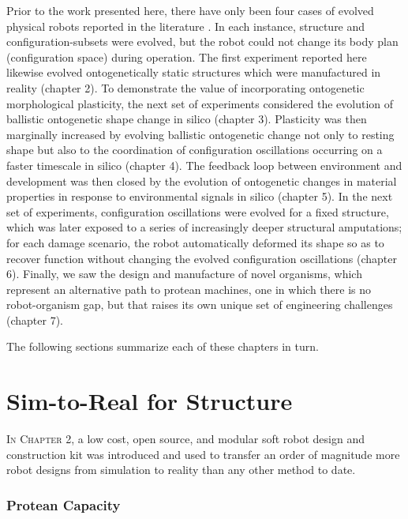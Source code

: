 Prior to the work presented here,
there have only been four cases of evolved physical robots reported in the literature
\cite{lipson2000automatic,hiller2012automatic,brodbeck2015morphological,cellucci20171d}.
In each instance, structure and configuration-subsets were evolved, but the robot could not change its body plan (configuration space) during operation.
The first experiment reported here likewise evolved ontogenetically static structures which were manufactured in reality (chapter 2).
To demonstrate 
the value of incorporating ontogenetic morphological plasticity,
the next set of experiments considered
the evolution of ballistic ontogenetic shape change in silico (chapter 3).
Plasticity was then marginally increased by
evolving ballistic ontogenetic change not only to resting shape but also to the coordination of configuration oscillations occurring on a faster timescale in silico (chapter 4).
The feedback loop between environment and development was then closed by
the evolution of ontogenetic changes in material properties in response to environmental signals in silico (chapter 5).
In the next set of experiments,
configuration oscillations were evolved for a fixed structure,
which was later exposed to a series of 
increasingly deeper structural amputations;
for each damage scenario, the robot automatically deformed its shape so as to recover function without changing the evolved configuration oscillations (chapter 6).
Finally, we saw the design and manufacture of novel organisms, which represent an alternative path to protean machines, one in which there is no robot-organism gap, but that raises its own unique set of engineering challenges (chapter 7).

The following sections summarize each of these 
chapters in turn.


\section{Sim-to-Real for Structure}

\textsc{In Chapter 2,}
a low cost, open source, and modular soft robot design and construction kit was introduced and used to
transfer an order of magnitude more robot designs from simulation to reality than any other method to date.

\subsubsection*{Protean Capacity}

